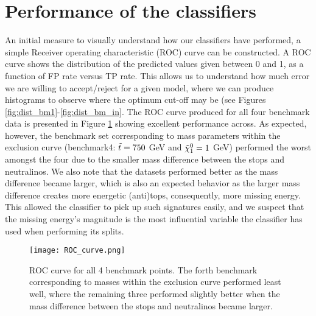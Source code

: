 
\section{Performance of the classifiers}
An initial measure to visually understand how our classifiers have performed, a simple Receiver operating characteristic (ROC) curve can be constructed. A ROC curve shows the distribution of the predicted values given between 0 and 1, as a function of FP rate versus TP rate. This allows us to understand how much error we are willing to accept/reject for a given model, where we can produce histograms to observe where the optimum cut-off may be (see Figures \ref{fig:dist_bm1}-\ref{fig:dist_bm_in}. The ROC curve produced for all four benchmark data is presented in Figure \ref{fig:ROC} showing excellent performance across. As expected, however, the benchmark set corresponding to mass parameters within the exclusion curve (benchmark4: $\Tilde{t} = 750$ GeV and $\Tilde{\chi}_1^0 = 1$ GeV) performed the worst amongst the four due to the smaller mass difference between the stops and neutralinos. We also note that the datasets performed better as the mass difference became larger, which is also an expected behavior as the larger mass difference creates more energetic (anti)tops, consequently, more missing energy. This allowed the classifier to pick up such signatures easily, and we suspect that the missing energy's magnitude is the most influential variable the classifier has used when performing its splits. \\


\begin{figure}[htbp]
    \centering
    \texttt{[image: ROC\_curve.png]}
    \caption{ROC curve for all 4 benchmark points. The forth benchmark corresponding to masses within the exclusion curve performed least well, where the remaining three performed slightly better when the mass difference between the stops and neutralinos became larger.}
    \label{fig:ROC}
\end{figure} 

